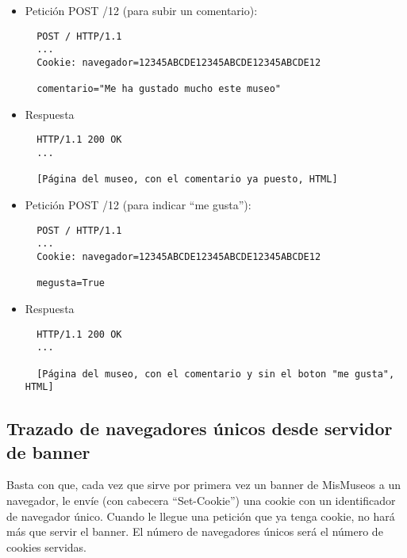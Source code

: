 {\begin{itemize}
\item Petición POST /12 (para subir un comentario):

\begin{verbatim}
  POST / HTTP/1.1
  ...
  Cookie: navegador=12345ABCDE12345ABCDE12345ABCDE12
  
  comentario="Me ha gustado mucho este museo"
\end{verbatim}

\item Respuesta

\begin{verbatim}
  HTTP/1.1 200 OK
  ...

  [Página del museo, con el comentario ya puesto, HTML]
\end{verbatim}

\item Petición POST /12 (para indicar ``me gusta''):

\begin{verbatim}
  POST / HTTP/1.1
  ...
  Cookie: navegador=12345ABCDE12345ABCDE12345ABCDE12
  
  megusta=True
\end{verbatim}

\item Respuesta

\begin{verbatim}
  HTTP/1.1 200 OK
  ...

  [Página del museo, con el comentario y sin el boton "me gusta", HTML]
\end{verbatim}

\end{itemize}


\subsection*{Trazado de navegadores únicos desde servidor de banner}

Basta con que, cada vez que sirve por primera vez un banner de MisMuseos a un navegador, le envíe (con cabecera ``Set-Cookie'') una cookie con un identificador de navegador único. Cuando le llegue una petición que ya tenga cookie, no hará más que servir el banner. El número de navegadores únicos será el número de cookies servidas.



}
